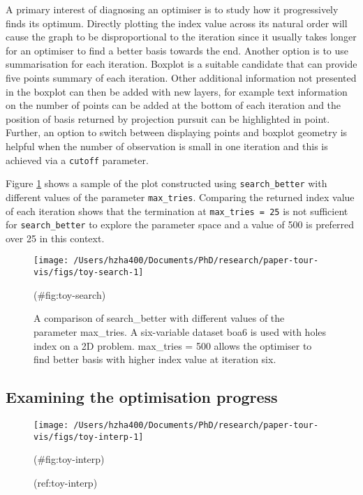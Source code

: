 A primary interest of diagnosing an optimiser is to study how it progressively finds its optimum. Directly plotting the index value across its natural order will cause the graph to be disproportional to the iteration since it usually takes longer for an optimiser to find a better basis towards the end. Another option is to use summarisation for each iteration. Boxplot is a suitable candidate that can provide five points summary of each iteration. Other additional information not presented in the boxplot can then be added with new layers, for example text information on the number of points can be added at the bottom of each iteration and the position of basis returned by projection pursuit can be highlighted in point. Further, an option to switch between displaying points and boxplot geometry is helpful when the number of observation is small in one iteration and this is achieved via a \texttt{cutoff} parameter.

Figure \ref{fig:toy-search} shows a sample of the plot constructed using \texttt{search\_better} with different values of the parameter \texttt{max\_tries}. Comparing the returned index value of each iteration shows that the termination at \texttt{max\_tries\ =\ 25} is not sufficient for \texttt{search\_better} to explore the parameter space and a value of 500 is preferred over 25 in this context.

\begin{Schunk}
\begin{figure}

{\centering \texttt{[image: /Users/hzha400/Documents/PhD/research/paper-tour-vis/figs/toy-search-1]} 

}

\caption{\label{fig:toy-search} A comparison of search\_better with different values of the parameter max\_tries. A six-variable dataset boa6 is used with holes index on a 2D problem. max\_tries = 500 allows the optimiser to find better basis with higher index value at iteration six.}(\#fig:toy-search)
\end{figure}
\end{Schunk}

\hypertarget{toy-interp}{%
\subsection{Examining the optimisation progress}\label{toy-interp}}

\begin{Schunk}
\begin{figure}

{\centering \texttt{[image: /Users/hzha400/Documents/PhD/research/paper-tour-vis/figs/toy-interp-1]} 

}

\caption[(ref:toy-interp)]{(ref:toy-interp)}(\#fig:toy-interp)
\end{figure}
\end{Schunk}

